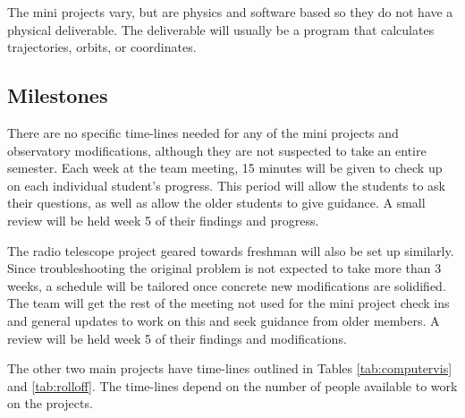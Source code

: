 \documentclass[conference]{IEEEtran} %
\begin{document}
The mini projects vary, but are physics and software based so they do not have a physical deliverable. The deliverable will usually be a program that calculates trajectories, orbits, or coordinates.


\subsection{Milestones}
\label{subsec:milestones}

There are no specific time-lines needed for any of the mini projects and observatory modifications, although they are not suspected to take an entire semester. Each week at the team meeting, 15 minutes will be given to check up on each individual student's progress. This period will allow the students to ask their questions, as well as allow the older students to give guidance. A small review will be held week 5 of their findings and progress.

The radio telescope project geared towards freshman will also be set up similarly. Since troubleshooting the original problem is not expected to take more than 3 weeks, a schedule will be tailored once concrete new modifications are solidified. The team will get the rest of the meeting not used for the mini project check ins and general updates to work on this and seek guidance from older members. A review will be held week 5 of their findings and modifications.

The other two main projects have time-lines outlined in Tables \ref{tab:computervis} and \ref{tab:rolloff}. The time-lines depend on the number of people available to work on the projects.
\end{document}
